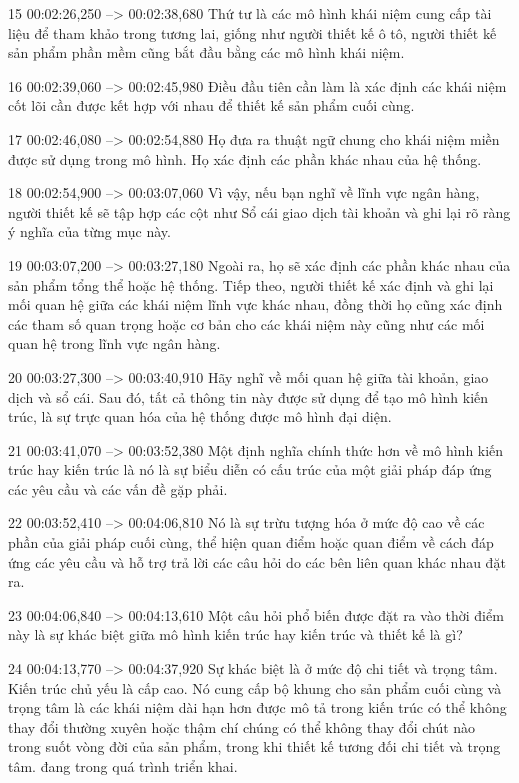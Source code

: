 15
00:02:26,250 --> 00:02:38,680
Thứ tư là các mô hình khái niệm cung cấp tài liệu để tham khảo trong tương lai, giống như người thiết kế ô tô, người thiết kế sản phẩm phần mềm cũng bắt đầu bằng các mô hình khái niệm.

16
00:02:39,060 --> 00:02:45,980
Điều đầu tiên cần làm là xác định các khái niệm cốt lõi cần được kết hợp với nhau để thiết kế sản phẩm cuối cùng.

17
00:02:46,080 --> 00:02:54,880
Họ đưa ra thuật ngữ chung cho khái niệm miền được sử dụng trong mô hình.  Họ xác định các phần khác nhau của hệ thống.

18
00:02:54,900 --> 00:03:07,060
Vì vậy, nếu bạn nghĩ về lĩnh vực ngân hàng, người thiết kế sẽ tập hợp các cột như Sổ cái giao dịch tài khoản và ghi lại rõ ràng ý nghĩa của từng mục này.

19
00:03:07,200 --> 00:03:27,180
Ngoài ra, họ sẽ xác định các phần khác nhau của sản phẩm tổng thể hoặc hệ thống.  Tiếp theo, người thiết kế xác định và ghi lại mối quan hệ giữa các khái niệm lĩnh vực khác nhau, đồng thời họ cũng xác định các tham số quan trọng hoặc cơ bản cho các khái niệm này cũng như các mối quan hệ trong lĩnh vực ngân hàng.

20
00:03:27,300 --> 00:03:40,910
Hãy nghĩ về mối quan hệ giữa tài khoản, giao dịch và sổ cái.  Sau đó, tất cả thông tin này được sử dụng để tạo mô hình kiến ​​trúc, là sự trực quan hóa của hệ thống được mô hình đại diện.

21
00:03:41,070 --> 00:03:52,380
Một định nghĩa chính thức hơn về mô hình kiến ​​trúc hay kiến ​​trúc là nó là sự biểu diễn có cấu trúc của một giải pháp đáp ứng các yêu cầu và các vấn đề gặp phải.

22
00:03:52,410 --> 00:04:06,810
Nó là sự trừu tượng hóa ở mức độ cao về các phần của giải pháp cuối cùng, thể hiện quan điểm hoặc quan điểm về cách đáp ứng các yêu cầu và hỗ trợ trả lời các câu hỏi do các bên liên quan khác nhau đặt ra.

23
00:04:06,840 --> 00:04:13,610
Một câu hỏi phổ biến được đặt ra vào thời điểm này là sự khác biệt giữa mô hình kiến ​​trúc hay kiến ​​trúc và thiết kế là gì?

24
00:04:13,770 --> 00:04:37,920
Sự khác biệt là ở mức độ chi tiết và trọng tâm.  Kiến trúc chủ yếu là cấp cao.  Nó cung cấp bộ khung cho sản phẩm cuối cùng và trọng tâm là các khái niệm dài hạn hơn được mô tả trong kiến ​​trúc có thể không thay đổi thường xuyên hoặc thậm chí chúng có thể không thay đổi chút nào trong suốt vòng đời của sản phẩm, trong khi thiết kế tương đối chi tiết và trọng tâm.  đang trong quá trình triển khai.

